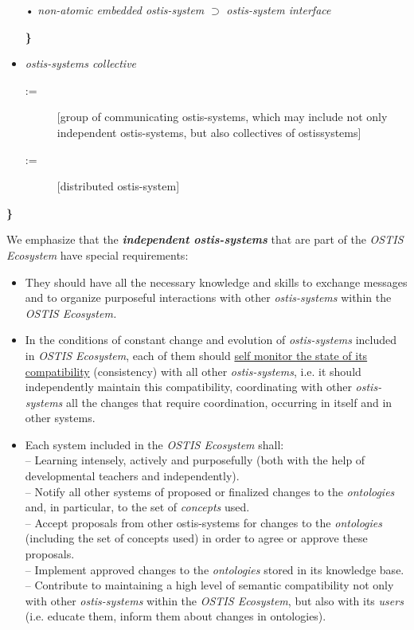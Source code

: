 \documentclass[a4paper,10pt]{article}
\begin{document}
\begin{multicols}{2}
\begin{itemize}
 
\hspace{0.6cm} • \textit{non-atomic embedded ostis-system}
\hspace{0.9cm} $\supset$ \textit{ostis-system interface} 

\hspace{0.6cm}\textbf{\}}

  \item \textit{ostis-systems collective}
  \begin{description}
        \item[:=][group of communicating ostis-systems,
which may include not only independent
ostis-systems, but also collectives of ostissystems]
        \item[:=] [distributed ostis-system]
    \end{description}





\end{itemize}


\hspace{-0.2cm}\textbf{\}}


We emphasize that the \textbf{\textit{independent ostis-systems}} that
are part of the \textit{OSTIS Ecosystem} have special requirements:
\begin{itemize}
    \item They should have all the necessary knowledge and
skills to exchange messages and to organize purposeful interactions with other \textit{ostis-systems} within the
\textit{OSTIS Ecosystem.}
   \item In the conditions of constant change and evolution of \textit{ostis-systems} included in \textit{OSTIS Ecosystem},
each of them should \underline{self monitor the state of
its compatibility} (consistency) with all other \textit{ostis-systems}, i.e. it should independently maintain this
compatibility, coordinating with other \textit{ostis-systems}
all the changes that require coordination, occurring
in itself and in other systems.
     \item Each system included in the \textit{OSTIS Ecosystem} shall: \\
– Learning intensely, actively and purposefully
(both with the help of developmental teachers and
independently).\\
– Notify all other systems of proposed or finalized
changes to the \textit{ontologies} and, in particular, to the
set of \textit{concepts} used.\\
– Accept proposals from other ostis-systems for
changes to the \textit{ontologies} (including the set of
concepts used) in order to agree or approve these
proposals.\\
– Implement approved changes to the \textit{ontologies}
stored in its knowledge base.\\
– Contribute to maintaining a high level of semantic compatibility not only with other \textit{ostis-systems} within the \textit{OSTIS Ecosystem}, but also
with its \textit{users} (i.e. educate them, inform them
about changes in ontologies).
\end{itemize}



\end{multicols}
\end{document}
